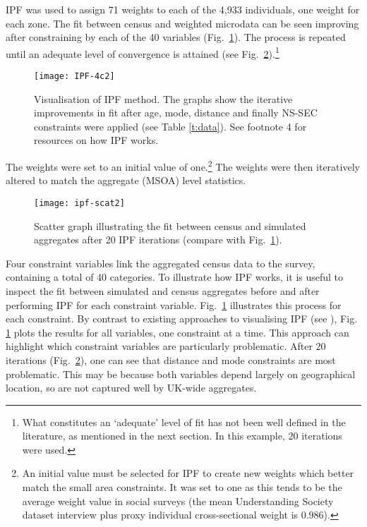 IPF was used to assign 71 weights to
each of the 4,933 individuals, one weight for each zone. The fit
between census and weighted microdata can be seen
improving after constraining by each of the 40 variables
(Fig.~\ref{fig:IPF-4c}).
The process is repeated until an adequate level
of convergence is attained (see Fig.~\ref{fig:ipf-scat}).\footnote{What
constitutes an `adequate' level of fit has not been well defined in the
literature, as mentioned in the next section. In this example, 20
iterations were used.}
\begin{figure}[h]
 \centerline{
 \texttt{[image: IPF-4c2]}}
 \caption[Visualisation of IPF method]{Visualisation of IPF method. The graphs
show the iterative
improvements in fit after age, mode, distance and finally NS-SEC constraints
were applied (see Table \ref{t:data}). See footnote 4 for resources on how IPF
works.}
 \label{fig:IPF-4c}
\end{figure}
The weights were set to an initial value of
one.\footnote{An initial value must be selected for IPF to create new weights
which better match the small area constraints.
It was set to one as this tends to be the average weight value in social surveys
(the mean Understanding Society dataset interview plus proxy individual
cross-sectional weight is 0.986).}
The weights were then iteratively
altered to match the aggregate (MSOA) level statistics.

\begin{figure}[h]
 \centerline{
 \texttt{[image: ipf-scat2]}}
 \caption[Scatter graph illustrating the fit between census and simulated
aggregates]{Scatter graph illustrating the fit between census and simulated
aggregates after 20 IPF iterations (compare with Fig.~\ref{fig:IPF-4c}).}
 \label{fig:ipf-scat}
\end{figure}

Four constraint variables link the aggregated census data to the survey,
containing a total of 40 categories. To illustrate how IPF works, it is useful
to inspect the fit between simulated and census aggregates before and after
performing IPF for each constraint variable. Fig.~\ref{fig:IPF-4c}
illustrates this process for each constraint. By contrast to existing
approaches to visualising IPF (see \citealp{Ballas2005b}), Fig.
\ref{fig:IPF-4c} plots the results for all variables, one
constraint at a time. This approach can highlight which constraint variables
are particularly problematic. After 20
iterations (Fig.~\ref{fig:ipf-scat}), one can see that distance and mode
constraints are most problematic. This may be because both variables depend
largely on geographical location, so are not captured well by UK-wide
aggregates.

